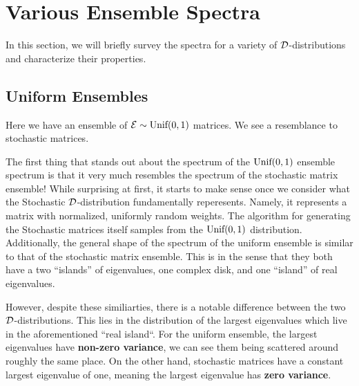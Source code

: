 \section{Various Ensemble Spectra}

In this section, we will briefly survey the spectra for a variety of $\mathcal{D}$-distributions and characterize their properties.

\subsection{Uniform Ensembles}
Here we have an ensemble of $\mathcal{E} \sim \text{Unif}(0,1)$ matrices. We see a resemblance to
stochastic matrices.

\vspace{-1em}
\vspace{-2em}

The first thing that stands out about the spectrum of the $\text{Unif}(0,1)$ ensemble spectrum is that it very much resembles the spectrum of the stochastic matrix ensemble!
While surprising at first, it starts to make sense once we consider what the Stochastic $\mathcal{D}$-distribution fundamentally reperesents. Namely, it represents a matrix with normalized, uniformly random weights. The algorithm for generating the Stochastic matrices itself samples from the $\text{Unif}(0,1)$ distribution. Additionally, the general shape of the spectrum of the uniform ensemble is similar to that of the stochastic matrix ensemble. This is in the sense that they both have a two ``islands'' of eigenvalues, one complex disk, and one ``island'' of real eigenvalues. \newline

However, despite these similiarties, there is a notable difference between the two $\mathcal{D}$-distributions. This lies in the distribution of the largest eigenvalues which live in the aforementioned ``real island``. For the uniform ensemble, the largest eigenvalues have \textbf{non-zero variance}, we can see them being scattered around roughly the same place. On the other hand, stochastic matrices have a constant largest eigenvalue of one, meaning the largest eigenvalue has \textbf{zero variance}.

